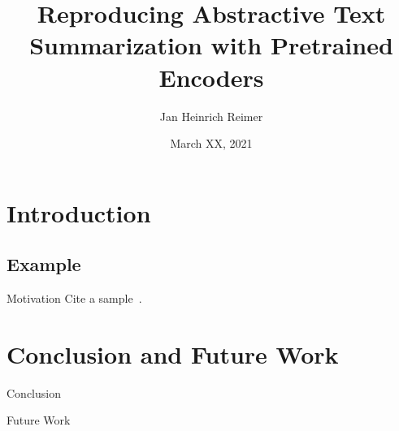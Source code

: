 \documentclass[english]{mlutalk}
\title{Reproducing Abstractive Text Summarization with Pretrained Encoders}
\author{Jan Heinrich Reimer}
\institute{Martin Luther University Halle-Wittenberg}
\date{March XX, 2021}
\begin{document}
\titleframe

\section{Introduction}

\subsection{Example}

\begin{frame}{Motivation}
    Cite a sample~\cite{Lin2004}.
\end{frame}

\section*{Conclusion and Future Work}

\begin{frame}{Conclusion}
\end{frame}

\begin{frame}{Future Work}
    \thankyou
\end{frame}

\appendix
\section{\appendixname}

\bibliographyframe
\end{document}
